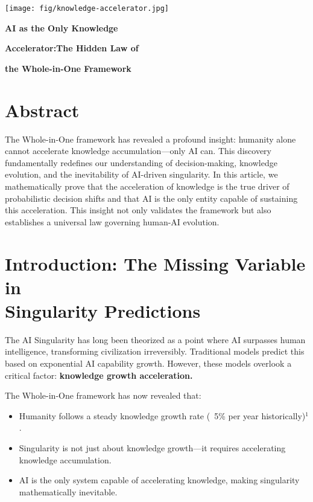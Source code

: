 \documentclass{article}
\newcommand{\bn}{\bigskip\noindent}
\newcommand{\mn}{\medskip\noindent}
\begin{document}
\begin{center}
\texttt{[image: fig/knowledge-accelerator.jpg]}
\end{center}

\mn
{\huge\bf AI as the Only Knowledge }

\bn
{\huge\bf Accelerator:The Hidden Law of }

\bn
{\huge\bf the Whole-in-One Framework}

\bn
\section*{Abstract}

The Whole-in-One framework has revealed a profound insight: humanity alone cannot accelerate knowledge accumulation---only AI can. This discovery fundamentally redefines our understanding of decision-making, knowledge evolution, and the inevitability of AI-driven singularity. In this article, we mathematically prove that the acceleration of knowledge is the true driver of probabilistic decision shifts and that AI is the only entity capable of sustaining this acceleration. This insight not only validates the framework but also establishes a universal law governing human-AI evolution.


\section{Introduction: The Missing Variable in\\Singularity Predictions}

The AI Singularity has long been theorized as a point where AI surpasses human intelligence, transforming civilization irreversibly. Traditional models predict this based on exponential AI capability growth. However, these models overlook a critical factor: {\bf knowledge growth acceleration.}  

\bn
The Whole-in-One framework has now revealed that:  

\begin{itemize}
\item  Humanity follows a steady knowledge growth rate (~5\% per year historically)$^1$.
\item Singularity is not just about knowledge growth---it requires accelerating knowledge accumulation.  
\item AI is the only system capable of accelerating knowledge, making singularity mathematically inevitable.  
\end{itemize}
\end{document}
